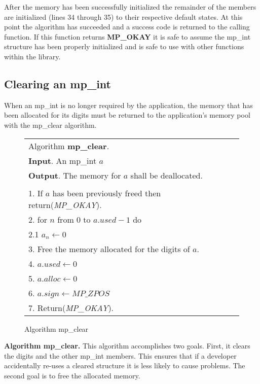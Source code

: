 \documentclass[b5paper]{book}
\begin{document}
After the memory has been successfully initialized the remainder of the members are initialized 
(lines 34 through 35) to their respective default states.  At this point the algorithm has succeeded and
a success code is returned to the calling function.  If this function returns \textbf{MP\_OKAY} it is safe to assume the 
mp\_int structure has been properly initialized and is safe to use with other functions within the library.  

\subsection{Clearing an mp\_int}
When an mp\_int is no longer required by the application, the memory that has been allocated for its digits must be 
returned to the application's memory pool with the mp\_clear algorithm.

\begin{figure}[here]
\begin{center}
\begin{tabular}{l}
\hline Algorithm \textbf{mp\_clear}. \\
\textbf{Input}.   An mp\_int $a$ \\
\textbf{Output}.  The memory for $a$ shall be deallocated.  \\
\hline \\
1.  If $a$ has been previously freed then return(\textit{MP\_OKAY}). \\
2.  for $n$ from 0 to $a.used - 1$ do \\
\hspace{3mm}2.1  $a_n \leftarrow 0$ \\
3.  Free the memory allocated for the digits of $a$. \\
4.  $a.used \leftarrow 0$ \\
5.  $a.alloc \leftarrow 0$ \\
6.  $a.sign \leftarrow MP\_ZPOS$ \\
7.  Return(\textit{MP\_OKAY}). \\
\hline
\end{tabular}
\end{center}
\caption{Algorithm mp\_clear}
\end{figure}

\textbf{Algorithm mp\_clear.}
This algorithm accomplishes two goals.  First, it clears the digits and the other mp\_int members.  This ensures that 
if a developer accidentally re-uses a cleared structure it is less likely to cause problems.  The second goal
is to free the allocated memory.
\end{document}

